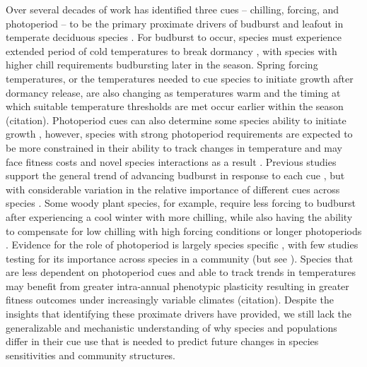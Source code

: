 \documentclass{article}\usepackage[]{graphicx}\usepackage[]{color}
\begin{document}
Over several decades of work has identified three cues -- chilling, forcing, and photoperiod -- to be the primary proximate drivers of budburst and leafout in temperate deciduous species \citep{Chuine2016}. For budburst to occur, species must experience extended period of cold temperatures to break dormancy \citep{Cooke2012}, with species with higher chill requirements budbursting later in the season. Spring forcing temperatures, or the temperatures needed to cue species to initiate growth after dormancy release, are also changing as temperatures warm and the timing at which suitable temperature thresholds are met occur earlier within the season (citation). Photoperiod cues can also determine some species ability to initiate growth \citep{Basler2014,Zohner2020}, however, species with strong photoperiod requirements are expected to be more constrained in their ability to track changes in temperature and may face fitness costs and novel species interactions as a result \citep{Guy2014}. Previous studies support the general trend of advancing budburst in response to each cue \citep{Flynn2018}, but with considerable variation in the relative importance of different cues across species \citep{Chuine2016,Flynn2018}. Some woody plant species, for example, require less forcing to budburst after experiencing a cool winter with more chilling, while also having the ability to compensate for low chilling with high forcing conditions or longer photoperiods \citep{Laube2014,Harrington2015,Flynn2018,Caffarra2011,Basler2014,Zohner2016}. Evidence for the role of photoperiod is largely species specific  \citep{Heide1993, Basler2014, Singh2017, Zohner2016}, with few studies testing for its importance across species in a community (but see  \cite{Flynn2018}). Species that are less dependent on photoperiod cues and able to track trends in temperatures may benefit from greater intra-annual phenotypic plasticity resulting in greater fitness outcomes under increasingly variable climates (citation). Despite the insights that identifying these proximate drivers have provided, we still lack the generalizable and mechanistic understanding of why species and populations differ in their cue use that is needed to predict future changes in species sensitivities and community structures.
\end{document}
